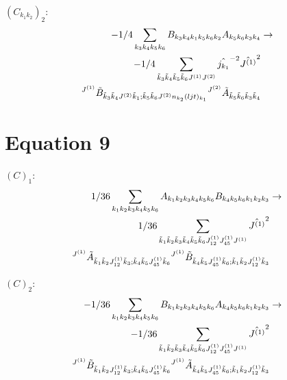 \documentclass[11pt]{article}
\begin{document}
$\left({C}_{{k}_{1}{k}_{2}}\right)_{2}$:
\begin{align}
-1/4\sum_{{k}_{3}{k}_{4}{k}_{5}{k}_{6}}{B}_{{k}_{3}{k}_{4}{k}_{1}{k}_{5}{k}_{6}{k}_{2}}{A}_{{k}_{5}{k}_{6}{k}_{3}{k}_{4}}&\rightarrow \notag \\-1/4\sum_{\tilde{k}_{3}\tilde{k}_{4}\tilde{k}_{5}\tilde{k}_{6}J^{(1)}J^{(2)}}\hat{j_{{k}_{1}}}^{-2}\hat{J^{(1)}}^{2}& \notag \\{}^{J^{(1)}}\tilde{B}_{\tilde{k}_{3}\tilde{k}_{4}J^{(2)}\tilde{k}_{1};\tilde{k}_{5}\tilde{k}_{6}J^{(2)}n_{{k}_{2}}(ljt)_{{k}_{1}}}{}^{J^{(2)}}\tilde{A}_{\tilde{k}_{5}\tilde{k}_{6}\tilde{k}_{3}\tilde{k}_{4}}& \notag \\
\end{align}

\section{Equation 9}
$\left({C}\right)_{1}$:
\begin{align}
1/36\sum_{{k}_{1}{k}_{2}{k}_{3}{k}_{4}{k}_{5}{k}_{6}}{A}_{{k}_{1}{k}_{2}{k}_{3}{k}_{4}{k}_{5}{k}_{6}}{B}_{{k}_{4}{k}_{5}{k}_{6}{k}_{1}{k}_{2}{k}_{3}}&\rightarrow \notag \\1/36\sum_{\tilde{k}_{1}\tilde{k}_{2}\tilde{k}_{3}\tilde{k}_{4}\tilde{k}_{5}\tilde{k}_{6}J^{(1)}_{12}J^{(1)}_{45}J^{(1)}}\hat{J^{(1)}}^{2}& \notag \\{}^{J^{(1)}}\tilde{A}_{\tilde{k}_{1}\tilde{k}_{2}J^{(1)}_{12}\tilde{k}_{3};\tilde{k}_{4}\tilde{k}_{5}J^{(1)}_{45}\tilde{k}_{6}}{}^{J^{(1)}}\tilde{B}_{\tilde{k}_{4}\tilde{k}_{5}J^{(1)}_{45}\tilde{k}_{6};\tilde{k}_{1}\tilde{k}_{2}J^{(1)}_{12}\tilde{k}_{3}}& \notag \\
\end{align}

$\left({C}\right)_{2}$:
\begin{align}
-1/36\sum_{{k}_{1}{k}_{2}{k}_{3}{k}_{4}{k}_{5}{k}_{6}}{B}_{{k}_{1}{k}_{2}{k}_{3}{k}_{4}{k}_{5}{k}_{6}}{A}_{{k}_{4}{k}_{5}{k}_{6}{k}_{1}{k}_{2}{k}_{3}}&\rightarrow \notag \\-1/36\sum_{\tilde{k}_{1}\tilde{k}_{2}\tilde{k}_{3}\tilde{k}_{4}\tilde{k}_{5}\tilde{k}_{6}J^{(1)}_{12}J^{(1)}_{45}J^{(1)}}\hat{J^{(1)}}^{2}& \notag \\{}^{J^{(1)}}\tilde{B}_{\tilde{k}_{1}\tilde{k}_{2}J^{(1)}_{12}\tilde{k}_{3};\tilde{k}_{4}\tilde{k}_{5}J^{(1)}_{45}\tilde{k}_{6}}{}^{J^{(1)}}\tilde{A}_{\tilde{k}_{4}\tilde{k}_{5}J^{(1)}_{45}\tilde{k}_{6};\tilde{k}_{1}\tilde{k}_{2}J^{(1)}_{12}\tilde{k}_{3}}& \notag \\
\end{align}
\end{document}

